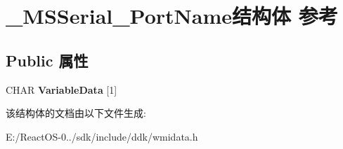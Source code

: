 \hypertarget{struct___m_s_serial___port_name}{}\section{\+\_\+\+M\+S\+Serial\+\_\+\+Port\+Name结构体 参考}
\label{struct___m_s_serial___port_name}
\subsection*{Public 属性}
\begin{DoxyCompactItemize}
\item 
\mbox{\label{struct___m_s_serial___port_name_ad3f3cfdfcd13acd51b314e37348d713c}} 
C\+H\+AR {\bfseries Variable\+Data} \mbox{[}1\mbox{]}
\end{DoxyCompactItemize}


该结构体的文档由以下文件生成\+:\begin{DoxyCompactItemize}
\item 
E\+:/\+React\+O\+S-\/0../sdk/include/ddk/wmidata.\+h\end{DoxyCompactItemize}
